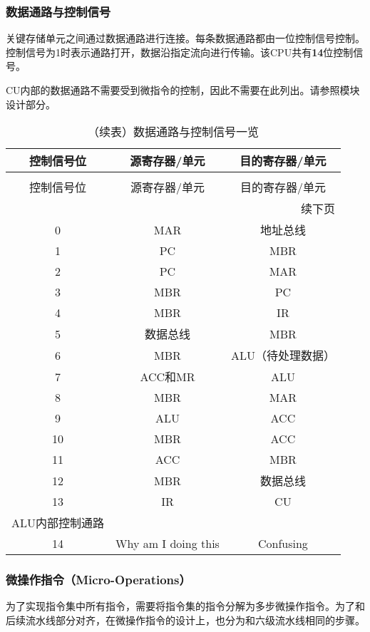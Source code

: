 \documentclass[lang=cn,a4paper,newtx]{elegantpaper}
\begin{document}
\subsubsection{数据通路与控制信号}\label{sec:datapath}
关键存储单元之间通过数据通路进行连接。每条数据通路都由一位控制信号控制。控制信号为1时表示通路打开，数据沿指定流向进行传输。该CPU共有\textbf{14}位控制信号。
\begin{remark}
  CU内部的数据通路不需要受到微指令的控制，因此不需要在此列出。请参照模块设计部分。
\end{remark}
\begin{longtable}{c c c}
  \caption{数据通路与控制信号一览} \label{tab:CPU:DataPath} \\
  \toprule
  控制信号位 & 源寄存器/单元  & 目的寄存器/单元  \\
  \midrule
  \endfirsthead

  \caption[]{（续表）数据通路与控制信号一览} \\
  \toprule
  控制信号位 & 源寄存器/单元  & 目的寄存器/单元  \\
  \midrule
  \endhead

  \midrule
  \multicolumn{3}{r}{续下页} \\
  \midrule
  \endfoot

  \bottomrule
  \endlastfoot

  0  & MAR   & 地址总线  \\
  1  & PC    & MBR  \\
  2  & PC    & MAR  \\
  3  & MBR   & PC  \\
  4  & MBR   & IR  \\
  5  & 数据总线 & MBR  \\
  6  & MBR   & ALU（待处理数据） \\
  7  & ACC和MR   & ALU  \\
  8  & MBR   & MAR  \\
  9  & ALU   & ACC  \\
  10 & MBR   & ACC  \\
  11 & ACC   & MBR  \\
  12 & MBR   & 数据总线  \\
  13 & IR    & CU  \\
  \hline
  ALU内部控制通路 & & \\
  \hline
  14 & Why am I doing this & Confusing \\
\end{longtable}

\subsubsection{微操作指令（Micro-Operations）}
为了实现指令集中所有指令，需要将指令集的指令分解为多步微操作指令。为了和后续流水线部分对齐，在微操作指令的设计上，也分为和六级流水线相同的步骤。
\end{document}
